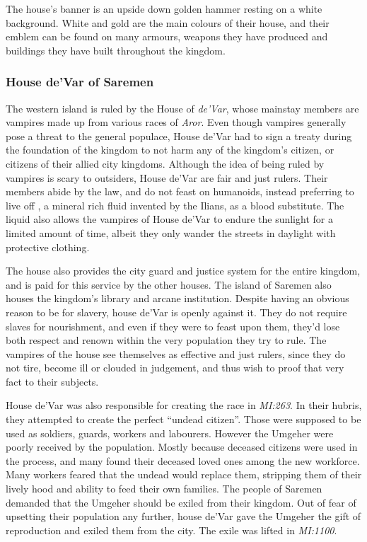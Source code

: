 The house's banner is an upside down golden hammer resting on a white
background. White and gold are the main colours of their house, and their
emblem can be found on many armours, weapons they have produced and buildings
they have built throughout the kingdom.

\subsubsection{House de'Var of Saremen}
\label{sec:House deVar}

The western island is ruled by the House of \emph{de'Var}, whose mainstay
members are vampires made up from various races of \emph{Aror}. Even though
vampires generally pose a threat to the general populace, House de'Var
had to sign a treaty during the foundation of the kingdom to not harm any of
the kingdom's citizen, or citizens of their allied city kingdoms. Although
the idea of being ruled by vampires is scary to outsiders, House de'Var
are fair and just rulers. Their members abide by the law, and do not feast on
humanoids, instead preferring to live off , a mineral rich
fluid invented by the Ilians, as a blood substitute. The liquid also allows the
vampires of House de'Var to endure the sunlight for a limited amount of time,
albeit they only wander the streets in daylight with protective clothing.

The house also provides the city guard and justice system for the entire
kingdom, and is paid for this service by the other houses. The island of
Saremen also houses the kingdom's library and arcane institution. Despite
having an obvious reason to be for slavery, house de'Var is openly against
it. They do not require slaves for nourishment, and even if they were to feast
upon them, they'd lose both respect and renown within the very population they
try to rule. The vampires of the house see themselves as effective and just
rulers, since they do not tire, become ill or clouded in judgement, and
thus wish to proof that very fact to their subjects.

House de'Var was also responsible for creating the race 
in \emph{MI:263}. In their hubris, they attempted to create the perfect
``undead citizen''. Those were supposed to be used as soldiers, guards,
workers and labourers. However the Umgeher were poorly received by the
population. Mostly because deceased citizens were used in the process, and
many found their deceased loved ones among the new workforce. Many workers
feared that the undead would replace them, stripping them of their lively hood
and ability to feed their own families. The people of Saremen demanded that
the Umgeher should be exiled from their kingdom. Out of fear of upsetting
their population any further, house de'Var gave the Umgeher the gift of
reproduction and exiled them from the city. The exile was lifted in
\emph{MI:1100}.


